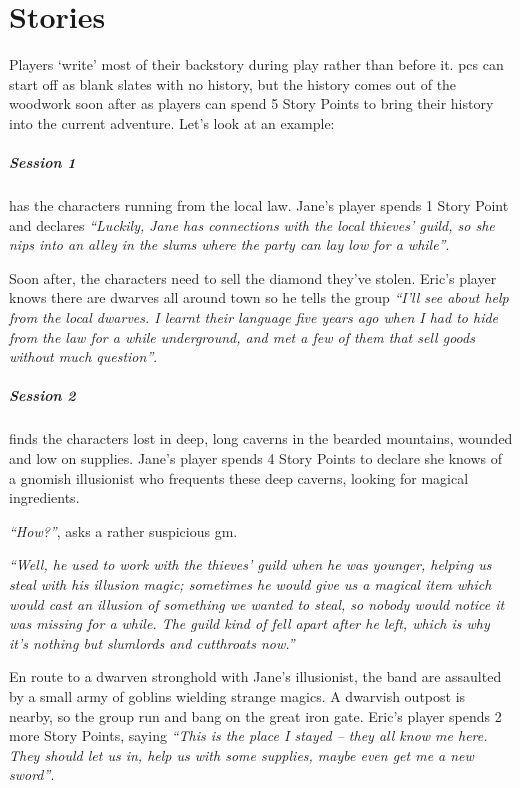 \chapter{Stories}\label{stories}

\begin{multicols}{2}

Players `write' most of their backstory during play rather than before it.  \Glspl{pc} can start off as blank slates with no history, but the history comes out of the woodwork soon after as players can spend 5 Story Points to bring their history into the current adventure.  Let's look at an example:

\paragraph{Session 1} has the characters running from the local law.  Jane's player spends 1 Story Point and declares \textit{``Luckily, Jane has connections with the local thieves' guild, so she nips into an alley in the slums where the party can lay low for a while''}.

Soon after, the characters need to sell the diamond they've stolen.
Eric's player knows there are dwarves all around town so he tells the group \textit{``I'll see about help from the local dwarves.
I learnt their language five years ago when I had to hide from the law for a while underground, and met a few of them that sell goods without much question''}.

\paragraph{Session 2} finds the characters lost in deep, long caverns in the bearded mountains, wounded and low on supplies.  Jane's player spends 4 Story Points to declare she knows of a gnomish illusionist who frequents these deep caverns, looking for magical ingredients.

\textit{``How?''}, asks a rather suspicious \gls{gm}.

\textit{``Well, he used to work with the thieves' guild when he was younger, helping us steal with his illusion magic; sometimes he would give us a magical item which would cast an illusion of something we wanted to steal, so nobody would notice it was missing for a while.
The guild kind of fell apart after he left, which is why it's nothing but slumlords and cutthroats now.''}

En route to a dwarven stronghold with Jane's illusionist, the band are assaulted by a small army of goblins wielding strange magics.
A dwarvish outpost is nearby, so the group run and bang on the great iron gate.  Eric's player spends 2 more Story Points, saying \textit{``This is the place I stayed -- they all know me here.  They should let us in, help us with some supplies, maybe even get me a new sword''}.


\end{multicols}
